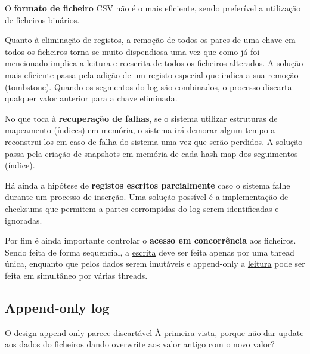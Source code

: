 \documentclass{article}
\begin{document}
\begin{flushleft}
  O \textbf{formato de ficheiro} CSV não é o mais eficiente, sendo preferível a utilização de ficheiros
  binários.

  \vspace{2mm}

  Quanto à eliminação de registos, a remoção de todos os pares de uma chave em todos os
  ficheiros torna-se muito dispendiosa uma vez que como já foi mencionado implica a leitura e
  reescrita de todos os ficheiros alterados. A solução mais eficiente passa pela adição de um
  registo especial que indica a sua remoção (tombstone). Quando os segmentos do log são combinados,
  o processo discarta qualquer valor anterior para a chave eliminada.

  \pagebreak

  No que toca à \textbf{recuperação de falhas}, se o sistema utilizar estruturas de mapeamento (índices)
  em memória, o sistema irá demorar algum tempo a reconstrui-los em caso de falha do sistema
  uma vez que serão perdidos. A solução passa pela criação de
  snapshots em memória de cada hash map dos seguimentos (índice).

  \vspace{2mm}

  Há ainda a hipótese de \textbf{registos escritos parcialmente} caso o sistema falhe durante um
  processo de inserção. Uma solução possível é a implementação de checksums que permitem a partes
  corrompidas do log serem identificadas e ignoradas.

  \vspace{2mm}

  Por fim é ainda importante controlar o \textbf{acesso em concorrência} aos ficheiros. Sendo feita de
  forma sequencial, a \uline{escrita} deve ser feita apenas por uma
  thread única, enquanto que pelos
  dados serem imutáveis e
  append-only a \uline{leitura} pode ser feita em simultâneo por várias
  threads.
\end{flushleft}

\subsection{Append-only log}

O design append-only parece discartável À primeira vista, porque não dar update
aos dados do ficheiros dando overwrite aos valor antigo com o novo valor?

\vspace{2mm}
\end{document}
